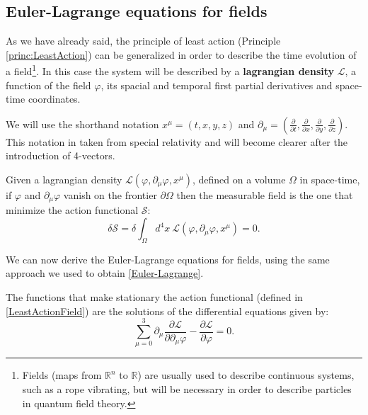 \subsection{Euler-Lagrange equations for fields}
As we have already said, the principle of least action (Principle \ref{princ:LeastAction}) can be generalized in order to describe the time evolution of a field\footnote{Fields (maps from $\mathbb{R} ^n$ to $\mathbb{R} $) are usually used to describe continuous systems, such as a rope vibrating, but will be necessary in order to describe particles in quantum field theory.}. In this case the system will be described by a \textbf{lagrangian density} $\mathcal{L}$, a function of the field $\varphi$, its spacial and temporal first partial derivatives and space-time coordinates.
\begin{notation}
    We will use the shorthand notation $x^\mu=(t,x,y,z)$ and $\partial_\mu=(\frac{\partial}{\partial t},\frac{\partial}{\partial x},\frac{\partial}{\partial y},\frac{\partial}{\partial z})$. This notation in taken from special relativity and will become clearer after the introduction of 4-vectors.
\end{notation}    
\begin{principle}\label{princ:LeastActionField}
   Given a lagrangian density $\mathcal{L} (\varphi,\partial_\mu\varphi,x^\mu)$, defined on a volume $\Omega$ in space-time, if $\varphi$ and $\partial_\mu\varphi$ vanish on the frontier $\partial \Omega $ then the measurable field is the one that minimize the action functional $\mathcal{S} $:
   \begin{equation}\label{LeastActionField}
         \delta \mathcal{S} =\delta \int_{\Omega}d^4x\ \mathcal{L} (\varphi,\partial_\mu\varphi,x^\mu)=0.
   \end{equation}
\end{principle} 
We can now derive the Euler-Lagrange equations for fields, using the same approach we used to obtain \eqref{Euler-Lagrange}.
\begin{theorem}
    The functions that make stationary the action functional (defined in \eqref{LeastActionField}) are the solutions of the differential equations given by:
    \begin{equation}\label{Euler-LagrangeFiled}
        \sum_{\mu=0}^{3}\partial_\mu\frac{\partial \mathcal{L} }{\partial \partial_\mu\varphi}-\frac{\partial \mathcal{L} }{\partial \varphi}=0.
    \end{equation}
\end{theorem}  
